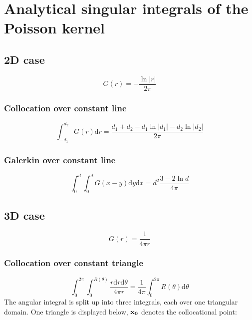 \documentclass[a4paper,10pt,twocolumn]{article}
\newcommand{\td}{\mathrm{d}}
\begin{document}
\section{Analytical singular integrals of the Poisson kernel}

\subsection{2D case}

\begin{equation}
G(r) = -\frac{\ln |r|}{2\pi}
\end{equation}

\subsubsection{Collocation over constant line}

\begin{equation}
\int_{-d_1}^{d_2} G(r) \td r
=
\frac{d_1 + d_2 - d_1 \ln |d_1| - d_2 \ln |d_2|}{2\pi}
\end{equation}


\subsubsection{Galerkin over constant line}

\begin{equation}
\int_{0}^{d} \int_{0}^{d} G(x-y) \td y \td x
=
d^2\frac{3-2\ln d}{4\pi}
\end{equation}


\subsection{3D case}

\begin{equation}
G(r) = \frac{1}{4\pi r}
\end{equation}

\subsubsection{Collocation over constant triangle}

\begin{equation}
\int_0^{2\pi} \int_0^{R(\theta)} \frac{r \td r \td \theta}{4\pi r}
=
\frac{1}{4\pi}\int_0^{2\pi} R(\theta) \td \theta
\end{equation}
%
The angular integral is split up into three integrals, each over one triangular domain.
One triangle is displayed below, $\bf x_0$ denotes the collocational point:
\end{document}
